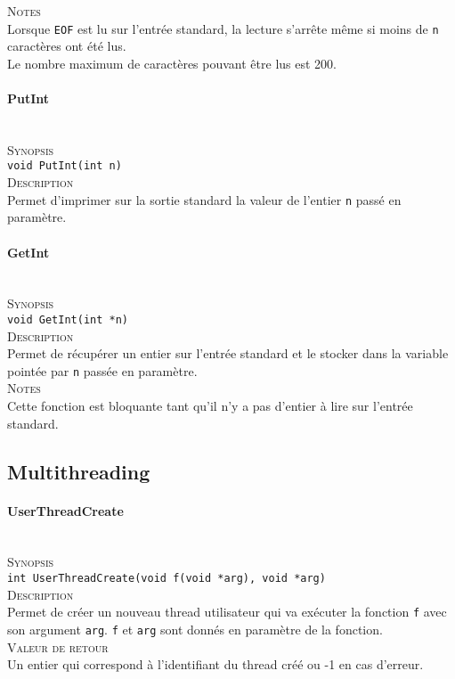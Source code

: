 \documentclass{report}
\newcommand{\myparagraph}[1]{\paragraph*{#1}\mbox{}\\}
\begin{document}
\textsc{Notes}\\
	Lorsque \texttt{EOF} est lu sur l'entrée standard, la lecture s'arrête même si moins de \texttt{n} caractères ont été lus.\\
	Le nombre maximum de caractères pouvant être lus est 200.\\
	
	
	
	
\myparagraph{PutInt}

\textsc{Synopsis}\\
	\texttt{void PutInt(int n)}\\
	
\textsc{Description}\\
	Permet d'imprimer sur la sortie standard la valeur de l'entier \texttt{n} passé en paramètre.\\
	

\myparagraph{GetInt}

\textsc{Synopsis}\\
	\texttt{void GetInt(int *n)}\\
	
\textsc{Description}\\
	Permet de récupérer un entier sur l'entrée standard et le stocker dans la variable pointée par \texttt{n} passée en paramètre.\\
	
\textsc{Notes}\\
	Cette fonction est bloquante tant qu'il n'y a pas d'entier à lire sur l'entrée standard.
	

\subsection*{Multithreading}
\myparagraph{UserThreadCreate}

\textsc{Synopsis}\\
	\texttt{int UserThreadCreate(void f(void *arg), void *arg)}\\
	
\textsc{Description}\\
	Permet de créer un nouveau thread utilisateur qui va exécuter la fonction \texttt{f} avec son argument \texttt{arg}. \texttt{f} et \texttt{arg} sont donnés en paramètre de la fonction.\\
	
\textsc{Valeur de retour}\\
	Un entier qui correspond à l'identifiant du thread créé ou -1 en cas d'erreur.\\
	
\end{document}
